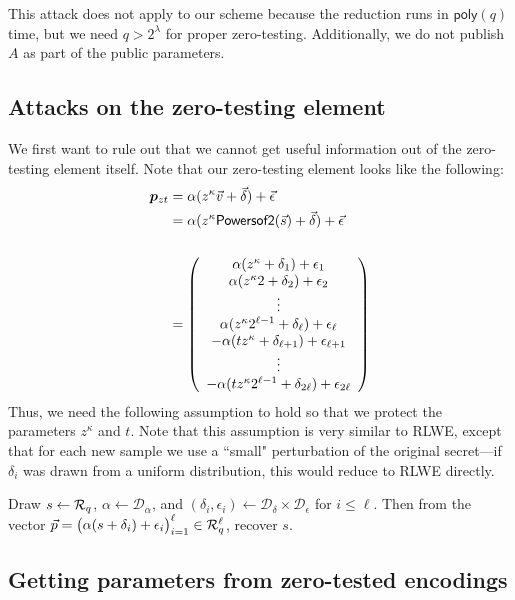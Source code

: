 This attack does not apply to our scheme because the reduction runs in $\mathsf{poly}(q)$ time, but we need $q > 2^\lambda$ for proper zero-testing.  Additionally, we do not publish $A$ as part of the public parameters.

\subsection{Attacks on the zero-testing element}

We first want to rule out that we cannot get useful information out of the zero-testing element itself.  Note that our zero-testing element looks like the following:
\begin{align*}
\bm{p}_{zt} &= \alpha (z^\kappa \vec{v} + \vec{\delta}) + \vec{\epsilon}\\
&= \alpha (z^\kappa \mathsf{Powersof2}(\vec{s}) + \vec{\delta}) + \vec{\epsilon}\\\\
&= \left( \begin{array}{c}
\alpha (z^\kappa + \delta_1) + \epsilon_1\\
\alpha (z^\kappa2 + \delta_2) + \epsilon_2\\
\vdots \\
\alpha (z^\kappa2^{\ell-1} + \delta_\ell) + \epsilon_\ell\\
-\alpha  (t z^\kappa + \delta_{\ell+1}) + \epsilon_{\ell + 1}\\
\vdots \\
-\alpha (t z^\kappa2^{\ell - 1} + \delta_{2\ell}) + \epsilon_{2\ell}\\
\end{array}\right)
\end{align*}
Thus, we need the following assumption to hold so that we protect the parameters $z^\kappa$ and $t$.  Note that this assumption is very similar to RLWE, except that for each new sample we use a ``small" perturbation of the original secret---if $\delta_i$ was drawn from a uniform distribution, this would reduce to RLWE directly.

\begin{assumption}
\label{rlwevar}
Draw $s \leftarrow \mathcal{R}_q$, $\alpha \leftarrow \mathcal{D}_\alpha$, and $(\delta_i, \epsilon_i) \leftarrow \mathcal{D}_\delta \times \mathcal{D}_\epsilon$ for $i \leq \ell$.  Then from the vector $\vec{p} = \big(\alpha(s + \delta_i) + \epsilon_i\big)_{i=1}^{\ell} \in \mathcal{R}_q^\ell$, recover $s$.
\end{assumption}


\subsection{Getting parameters from zero-tested encodings}

